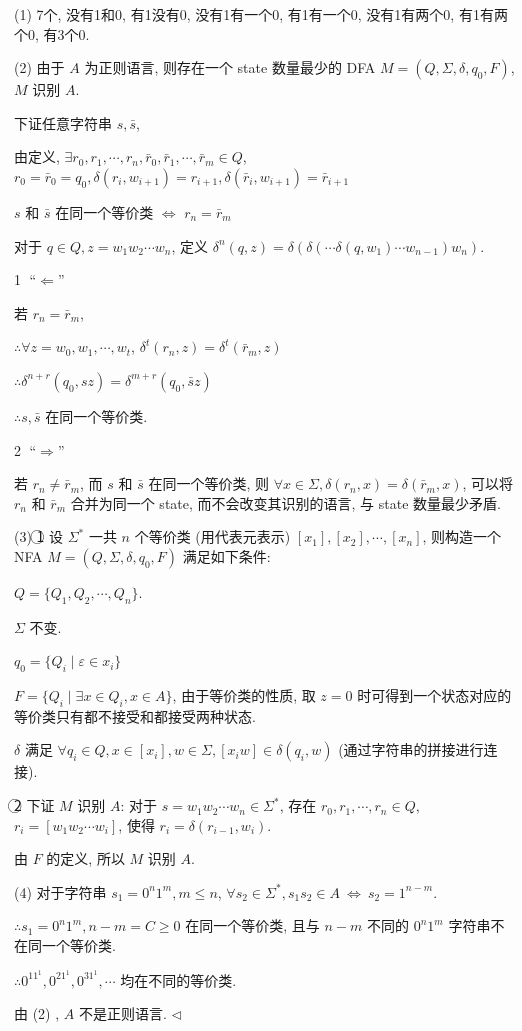 \documentclass[11pt]{article}
\newenvironment{answer}[1][Answer]{\begin{trivlist}
		\item[\hskip \labelsep {\bfseries #1.}\hskip \labelsep]}{\hfill$\lhd$\end{trivlist}}
\begin{document}
	\begin{answer}
		(1) 7个, 没有1和0, 有1没有0, 没有1有一个0, 有1有一个0, 没有1有两个0, 有1有两个0, 有3个0.
		
		(2) 由于 $A$ 为正则语言, 则存在一个 state 数量最少的 DFA $M=(Q,\Sigma,\delta,q_0,F)$, $M$ 识别 $A$.
		
		下证任意字符串 $s,\bar{s}$, 
		
		由定义, $\exists r_0,r_1,\cdots,r_n,\bar{r}_0,\bar{r}_1,\cdots,\bar{r}_m \in Q$, $r_0=\bar{r}_0=q_0,\delta(r_i,w_{i+1})=r_{i+1},\delta(\bar{r}_i,w_{i+1})=\bar{r}_{i+1}$
		
		$s$ 和 $\bar{s}$ 在同一个等价类 $\Leftrightarrow$ $r_n=\bar{r}_m$
		
		对于 $q\in Q,z=w_1w_2\cdots w_n$, 定义 $\delta^n(q,z)=\delta(\delta(\cdots\delta(q,w_1)\cdots w_{n-1})w_n)$.
		
		\textcircled{1} “$\Leftarrow$” 
		
		若 $r_n=\bar{r}_m$,
		 
		$\therefore\forall z=w_0,w_1,\cdots,w_t$, $\delta^t(r_n,z)=\delta^t(\bar{r}_m,z)$
		
		$\therefore \delta^{n+r}(q_0,sz)=\delta^{m+r}(q_0,\bar{s}z)$
		
		$\therefore s,\bar{s}$ 在同一个等价类.
		
		\textcircled{2} “$\Rightarrow$” 
		
		若 $r_n\neq\bar{r}_m$, 而	$s$ 和 $\bar{s}$ 在同一个等价类, 则 $\forall x\in\Sigma,\delta(r_n,x)=\delta(\bar{r}_m,x)$, 可以将 $r_n$ 和 $\bar{r}_m$ 合并为同一个 state, 而不会改变其识别的语言, 与 state 数量最少矛盾.
		
		(3) \textcircled{1} 设 $\Sigma^*$ 一共 $n$ 个等价类 (用代表元表示) $[x_1],[x_2],\cdots,[x_n]$, 则构造一个 NFA $M=(Q,\Sigma,\delta,q_0,F)$ 满足如下条件:
		
		$Q=\{Q_1,Q_2,\cdots,Q_n\}$.
		
		$\Sigma$ 不变.
		
		$q_0=\{Q_i\mid \varepsilon\in x_i\}$
		
		$F=\{Q_i\mid\exists x\in Q_i,x\in A\}$, 由于等价类的性质, 取 $z=0$ 时可得到一个状态对应的等价类只有都不接受和都接受两种状态.
		
		$\delta$ 满足 $\forall q_i\in Q,x\in[x_i],w\in\Sigma, [x_iw]\in\delta(q_i,w)$ (通过字符串的拼接进行连接).
		
		\textcircled{2} 下证 $M$ 识别 $A$: 对于 $s=w_1w_2\cdots w_n\in\Sigma^*$, 存在 $r_0,r_1,\cdots,r_n\in Q$, $r_i=[w_1w_2\cdots w_i]$, 使得 $r_i=\delta(r_{i-1},w_i)$.
		
		由 $F$ 的定义, 所以 $M$ 识别 $A$.
		
		(4) 对于字符串 $s_1=0^n1^m,m\leq n$, $\forall s_2\in\Sigma^*,s_1s_2\in A~\Leftrightarrow~s_2=1^{n-m}$.
		
		$\therefore s_1=0^n1^m,n-m=C\geq 0$ 在同一个等价类, 且与 $n-m$ 不同的 $0^n1^m$ 字符串不在同一个等价类.
		
		$\therefore 0^11^1,0^21^1,0^31^1,\cdots$ 均在不同的等价类.
		
		由 (2) , $A$ 不是正则语言.
	\end{answer}
\end{document}
